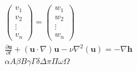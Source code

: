 \documentclass{article}
\begin{document}
\begin{gather*}
\begin{pmatrix}
            v_1\\v_2\\\vdots\\v_n
        \end{pmatrix}
        =
        \begin{pmatrix}
            w_1\\w_2\\\vdots\\w_n
        \end{pmatrix}\\
        \frac{\partial\textbf{u}}{\partial t} + (\textbf{u} \cdot \nabla)\textbf{u} - \nu\nabla^2(\textbf{u}) = -\nabla\textbf{h}\\
        \alpha A\beta B\gamma\Gamma\delta\Delta\pi\Pi\omega\Omega\\
    \end{gather*} 
\end{document}
